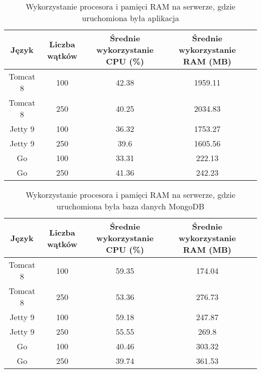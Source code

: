
\begin{table}[!htb]
\centering
\caption{Wykorzystanie procesora i pamięci RAM na serwerze, gdzie uruchomiona była aplikacja}
\label{tab:app-clean-crud}
\begin{tabular}{@{}ccccl@{}}
\toprule
\textbf{Język} & \textbf{Liczba wątków} & \multicolumn{1}{p{3cm}}{\textbf{Średnie wykorzystanie CPU (\%)}} & \multicolumn{1}{p{3cm}}{\textbf{Średnie wykorzystanie RAM (MB)}} &  \\ \midrule
Tomcat 8       & 100                    & 42.38                             & 1959.11                          &  \\
Tomcat 8       & 250                    & 40.25                             & 2034.83                          &  \\
Jetty 9       & 100                    & 36.32                             & 1753.27                          &  \\
Jetty 9       & 250                    & 39.6                             & 1605.56                          &  \\
Go       & 100                    & 33.31                             & 222.13                          &  \\
Go       & 250                    & 41.36                             & 242.23                          &  \\
\bottomrule
\end{tabular}
\end{table}


\begin{table}[!htb]
\centering
\caption{Wykorzystanie procesora i pamięci RAM na serwerze, gdzie uruchomiona była baza danych MongoDB}
\label{tab:mongo-clean-crud}
\begin{tabular}{@{}ccccl@{}}
\toprule
\textbf{Język} & \textbf{Liczba wątków} & \multicolumn{1}{p{3cm}}{\textbf{Średnie wykorzystanie CPU (\%)}} & \multicolumn{1}{p{3cm}}{\textbf{Średnie wykorzystanie RAM (MB)}} &  \\ \midrule
Tomcat 8       & 100                    & 59.35                             & 174.04                          &  \\
Tomcat 8       & 250                    & 53.36                             & 276.73                          &  \\
Jetty 9       & 100                    & 59.18                             & 247.87                          &  \\
Jetty 9       & 250                    & 55.55                             & 269.8                          &  \\
Go       & 100                    & 40.46                             & 303.32                          &  \\
Go       & 250                    & 39.74                             & 361.53                          &  \\
\bottomrule
\end{tabular}
\end{table}

